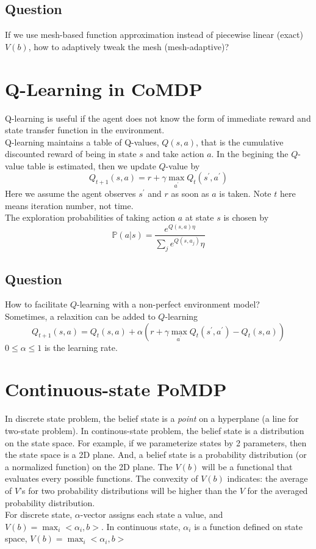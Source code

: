 \documentclass[a4paper,onecolumn]{article}
\begin{document}
\subsection{Question}
If we use mesh-based function approximation instead of piecewise linear
(exact) $V(b)$, how to adaptively tweak the mesh (mesh-adaptive)?

\section{Q-Learning in CoMDP}
Q-learning is useful if the agent does not know the form of immediate
reward and state transfer function in the environment.\\
Q-learning maintains a table of Q-values, $Q(s,a)$, that is the
cumulative discounted reward of being in state $s$ and take action $a$.
In the begining the $Q$-value table is estimated, then we update
$Q$-value by
\begin{equation}
    Q_{t+1}(s,a) = r + \gamma \max_{a^\prime} Q_t(s^\prime,a^\prime)
\end{equation}
Here we assume the agent observes $s^\prime$ and $r$ as soon as $a$ is
taken. Note $t$ here means iteration number, not time.\\
The exploration probabilities of taking action $a$ at state $s$ is
chosen by
\begin{equation}
    \mathbb{P}(a|s) = \frac{e^{Q(s,a)\eta}}{\sum_j e^{Q(s,a_j)}\eta}
\end{equation}
\subsection{Question}
How to facilitate $Q$-learning with a non-perfect environment model?\\

\noindent Sometimes, a relaxition can be added to $Q$-learning
\begin{equation}
    Q_{t+1}(s,a) = Q_t(s,a) + \alpha \left(r + \gamma \max_{a^\prime}
	Q_t(s^\prime,a^\prime) -Q_t(s,a)\right)
\end{equation}
$0\le\alpha\le 1$ is the learning rate.

\section{Continuous-state PoMDP}
\noindent In discrete state problem, the belief state is a \emph{point} on 
a hyperplane (a line for two-state problem).
In continous-state problem, the belief state is a distribution on the
state space. For example, if we parameterize states by 2 parameters,
then the state space is a 2D plane. And, a belief state is a
probability distribution (or a normalized function) on the 2D plane.
The $V(b)$ will be a functional that evaluates every possible functions.
The convexity of $V(b)$ indicates: the average of $V$'s for two
probability distributions will be higher than the $V$ for the averaged
probability distribution.\\

\noindent For discrete state, $\alpha$-vector assigns each state a
value, and $V(b) = \max_i <\alpha_i, b>$. In continuous state,
$\alpha_i$ is a function defined on state space, $V(b) = \max_i <\alpha_i, b>$
\end{document}

